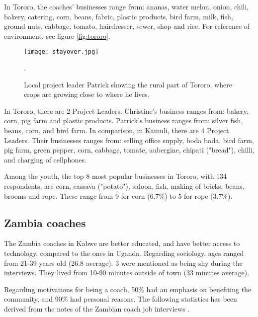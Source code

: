 In Tororo, the coaches' businesses range from: ananas, water melon, onion, chili, bakery, catering, corn, beans, fabric, plastic products, bird farm, milk, fish, ground nuts, cabbage, tomato, hairdresser, sewer, shop and rice. For reference of environment, see figure \ref{fig:tororo}.

\begin{figure}[h]
    \centering
    \texttt{[image: stayover.jpg]}
    \caption{Local project leader Patrick showing the rural part of Tororo, where crops are growing close to where he lives.}.
    \label{fig:duolingo}
\end{figure}

In Tororo, there are 2 Project Leaders. Christine's business ranges from: bakery, corn, pig farm and plastic products. Patrick's business ranges from: silver fish, beans, corn, and bird farm. In comparison, in Kamuli, there are 4 Project Leaders. Their businesses ranges from: selling office supply, boda boda, bird farm, pig farm, green pepper, corn, cabbage, tomate, aubergine, chipati ("bread"), chilli, and charging of cellphones.

Among the youth, the top 8 most popular businesses in Tororo, with 134 respondents, are corn, cassava ("potato"), saloon, fish, making of bricks, beans, brooms and rope. These range from 9 for corn (6.7\%) to 5 for rope (3.7\%).

\subsection{Zambia coaches}
The Zambia coaches in Kabwe are better educated, and have better access to technology, compared to the ones in Uganda. Regarding sociology, ages ranged from 21-39 years old (26.8 average). 3 were mentioned as being shy during the interviews. They lived from 10-90 minutes outside of town (33 minutes average).

Regarding motivations for being a coach, 50\% had an emphasis on benefiting the community, and 90\% had personal reasons. The following statistics has been derived from the notes of the Zambian coach job interviews \cite{yd-zambia-interviews}.

%

